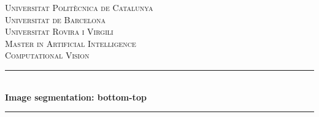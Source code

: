 \begin{titlepage}

\vspace*{\fill}

\newcommand{\HRule}{\rule{\linewidth}{0.5mm}} %

\center %
 

\textsc{\LARGE Universitat Politècnica de Catalunya}\\[0.5cm] %
\textsc{\LARGE Universitat de Barcelona}\\[0.5cm] %
\textsc{\LARGE Universitat Rovira i Virgili}\\[1.5cm] %
\textsc{\Large Master in Artificial Intelligence}\\[0.5cm] %
\textsc{\large Computational Vision}\\[0.5cm] %


\HRule \\[0.4cm]
{ \huge \bfseries Image segmentation: bottom-top}\\[0.4cm] %
\HRule \\[1.5cm]
 



\end{titlepage}
